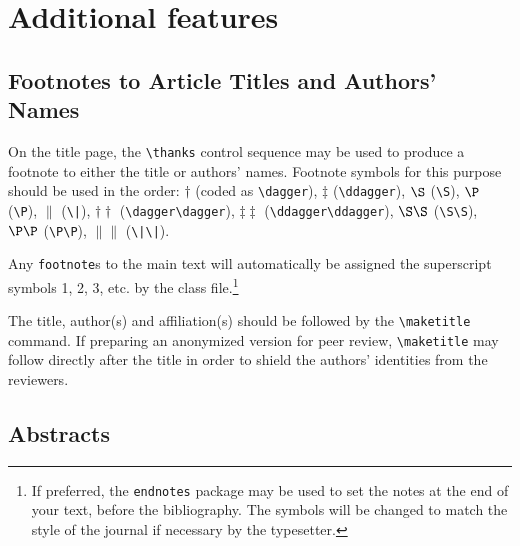 \documentclass{tATO2e}
\begin{document}
\section{Additional features}

\subsection{Footnotes to Article Titles and Authors' Names}

On the title page, the \verb"\thanks" control sequence may be used to produce a footnote to either the title or authors' names. Footnote symbols for this purpose should be used in the order:
$\dagger$ (coded as \verb"\dagger"), $\ddagger$ (\verb"\ddagger"), $\S$ (\verb"\S"), $\P$ (\verb"\P"), $\|$ (\verb"\|"), $\dagger\dagger$ (\verb"\dagger\dagger"), $\ddagger\ddagger$ (\verb"\ddagger\ddagger"),
$\S\S$ (\verb"\S\S"), $\P\P$ (\verb"\P\P"), $\|\|$ (\verb"\|\|").

Any \verb"footnote"s to the main text will automatically be assigned the superscript
 symbols 1, 2, 3, etc. by the class file.\footnote{If preferred, the \texttt{endnotes} package
 may be used to set the notes at the end of your text, before the bibliography.
 The symbols will be changed to match the style of the journal if necessary by the typesetter.}

The title, author(s) and affiliation(s) should be followed by the \verb"\maketitle" command. If preparing an anonymized version for peer review, \verb"\maketitle" may follow
directly after the title in order to shield the authors' identities from the reviewers.


\subsection{Abstracts}
\end{document}
